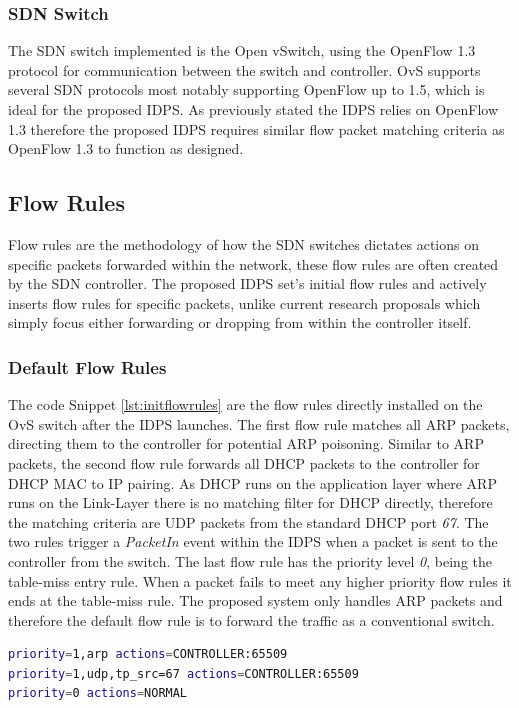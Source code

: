 \documentclass[12pt, oneside]{book}
\begin{document}
\subsubsection{SDN Switch}
The SDN switch implemented is the Open vSwitch, using the OpenFlow 1.3 protocol
for communication between the switch and controller. OvS supports several SDN protocols most notably supporting OpenFlow up to 1.5,
which is ideal for the proposed IDPS. As previously stated the IDPS relies on OpenFlow 1.3 therefore
the proposed IDPS requires similar flow packet matching criteria as OpenFlow 1.3 to function as designed.

\subsection{Flow Rules}
Flow rules are the methodology of how the SDN switches dictates actions on specific packets forwarded within the network,
these flow rules are often created by the SDN controller. The proposed IDPS set's initial flow rules and actively inserts
flow rules for specific packets, unlike current research proposals which simply focus either forwarding or dropping from within
the controller itself.

\subsubsection{Default Flow Rules}
The code Snippet \ref{lst:initflowrules} are the flow rules directly installed on the OvS switch after the IDPS launches.
The first flow rule matches all ARP packets, directing them to the controller for
potential ARP poisoning.
Similar to ARP packets, the second flow rule forwards all DHCP packets to the controller for DHCP MAC to IP pairing. As DHCP runs on
the application layer where ARP runs on the Link-Layer there is no matching filter for DHCP directly, therefore the matching criteria
are UDP packets from the standard DHCP port \emph{67}. The two rules trigger a \emph{PacketIn} event within the IDPS 
when a packet is sent to the controller from the switch.
The last flow rule has the priority level \emph{0}, being the table-miss entry rule. When a packet fails to meet any higher priority
flow rules it ends at the table-miss rule. The proposed system only handles ARP packets and therefore the 
default flow rule is to forward the traffic as a conventional switch.

\begin{lstlisting}[language=Bash,caption={Initial Flow Rules},captionpos=b,label={lst:initflowrules}]
priority=1,arp actions=CONTROLLER:65509
priority=1,udp,tp_src=67 actions=CONTROLLER:65509
priority=0 actions=NORMAL
\end{lstlisting}
\end{document}
